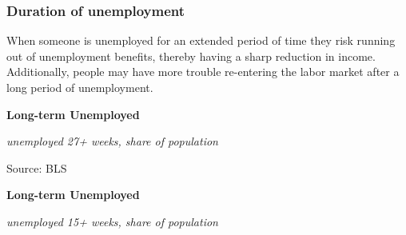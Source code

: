 \documentclass{report}
\makeatletter
\newcommand{\tbllink}[1]{\href{https://raw.githubusercontent.com/bdecon/US-chartbook/master/chartbook/data/#1}{\faTable}}
\newcommand*\short[1]{\expandafter\@gobbletwo\number\numexpr#1\relax}
\newcommand{\shdateaxisticks}{
		date coordinates in=x, axis line style={draw=none},
		xmax={2020-11-15},
		max space between ticks=40,	    
		xtick={{1990-01-01}, {1995-01-01}, {2000-01-01}, 
			{2005-01-01}, {2010-01-01}, {2015-01-01}, {2020-01-01}},
		minor xtick={},
		enlarge y limits={0.06}, enlarge x limits={0.01},
		}
\newcommand{\bbar}[2]{extra #1 ticks = {{#2}}, extra #1 tick labels = ,
		extra #1 tick style = {grid=major, grid style={thick, black!25}},}
\newcommand{\stdline}[4]{\addplot[very thick, no markers, color=#1] 
		table [x=#2, y=#3, col sep=comma] {#4};	}
\newcommand{\rbars}{
		\fill[color=black!10] (axis cs:{1990-07-01},\pgfkeysvalueof{/pgfplots/ymin}) rectangle 
			(axis cs:{1991-03-01}, \pgfkeysvalueof{/pgfplots/ymax});
		\fill[color=black!10] (axis cs:{2007-12-01},\pgfkeysvalueof{/pgfplots/ymin}) rectangle 
			(axis cs:{2009-07-01}, \pgfkeysvalueof{/pgfplots/ymax});
		\fill[color=black!10] (axis cs:{2001-03-01},\pgfkeysvalueof{/pgfplots/ymin}) rectangle 
			(axis cs:{2001-11-01}, \pgfkeysvalueof{/pgfplots/ymax});
		\fill[color=black!10] (axis cs:{2020-02-01},\pgfkeysvalueof{/pgfplots/ymin}) rectangle 
			(axis cs:{2020-10-01}, \pgfkeysvalueof{/pgfplots/ymax});}
\makeatother
\begin{document}
{{{{{{{{{\newpage

\begin{minipage}{0.76\textwidth} 
\subsubsection*{\color{black!70} \seriffont Duration of unemployment}
\small When someone is unemployed for an extended period of time they risk running out of unemployment benefits, thereby having a sharp reduction in income. Additionally, people may have more trouble re-entering the labor market after a long period of unemployment. \\


\end{minipage}

\vspace{3mm}

\begin{minipage}{0.37\textwidth}
\normalsize \textbf{Long-term Unemployed}

\footnotesize{\textit{unemployed 27+ weeks, share of population}}

\hspace*{-2mm} 

\footnotesize{Source: BLS} \hfill \tbllink{ltu.csv}
\end{minipage} \hspace{5mm}
\begin{minipage}{0.37\textwidth}
\normalsize \textbf{Long-term Unemployed}

\footnotesize{\textit{unemployed 15+ weeks, share of population}}

\hspace*{-2mm} 


\end{minipage}}}}}}}}}}
\end{document}
